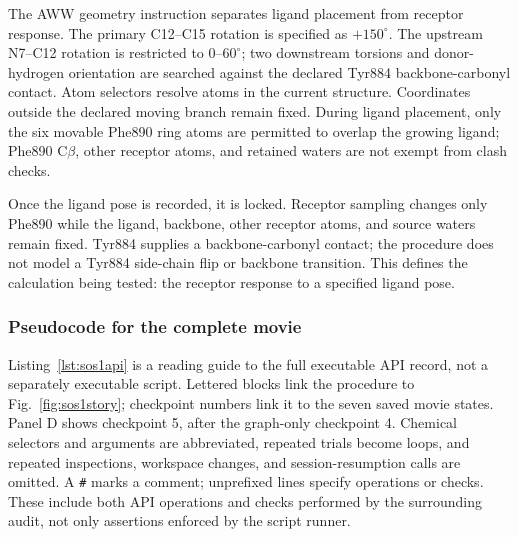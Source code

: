 \documentclass[11pt]{article}
\begin{document}
\begin{small}
The AWW geometry instruction separates ligand placement from receptor response. The primary C12--C15 rotation is specified as $+150^{\circ}$. The upstream N7--C12 rotation is restricted to $0$--$60^{\circ}$; two downstream torsions and donor-hydrogen orientation are searched against the declared Tyr884 backbone-carbonyl contact. Atom selectors resolve atoms in the current structure. Coordinates outside the declared moving branch remain fixed. During ligand placement, only the six movable Phe890 ring atoms are permitted to overlap the growing ligand; Phe890 C$\beta$, other receptor atoms, and retained waters are not exempt from clash checks.

Once the ligand pose is recorded, it is locked. Receptor sampling changes only Phe890 while the ligand, backbone, other receptor atoms, and source waters remain fixed. Tyr884 supplies a backbone-carbonyl contact; the procedure does not model a Tyr884 side-chain flip or backbone transition. This defines the calculation being tested: the receptor response to a specified ligand pose.

\subsubsection{Pseudocode for the complete movie}

Listing~\ref{lst:sos1api} is a reading guide to the full executable API record, not a separately executable script. Lettered blocks link the procedure to Fig.~\ref{fig:sos1story}; checkpoint numbers link it to the seven saved movie states. Panel D shows checkpoint 5, after the graph-only checkpoint 4. Chemical selectors and arguments are abbreviated, repeated trials become loops, and repeated inspections, workspace changes, and session-resumption calls are omitted. A \texttt{\#} marks a comment; unprefixed lines specify operations or checks. These include both API operations and checks performed by the surrounding audit, not only assertions enforced by the script runner.

\begingroup
{}
\newcommand{\sosstage}[4]{%
  \par\vspace{0.55em}\noindent
  {\bfseries\color{#1}#2\quad #3}\par
  {\small #4}\par\vspace{-0.35em}}


\end{small}
\end{document}
